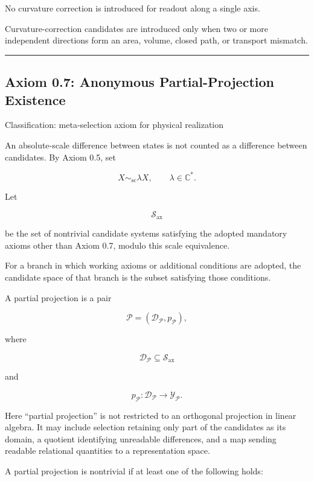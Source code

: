 \documentclass[
  a4paper,
]{article}
\begin{document}
No curvature correction is introduced for readout along a single axis.

Curvature-correction candidates are introduced only when two or more
independent directions form an area, volume, closed path, or transport
mismatch.

\begin{center}\rule{0.5\linewidth}{0.5pt}\end{center}

\subsection{Axiom 0.7: Anonymous Partial-Projection
Existence}\label{axiom-0.7-anonymous-partial-projection-existence}

Classification: meta-selection axiom for physical realization

An absolute-scale difference between states is not counted as a
difference between candidates. By Axiom 0.5, set

\[
X\sim_{\mathrm{sc}}\lambda X,
\qquad
\lambda\in\mathbb C^\ast.
\]

Let

\[
\mathscr S_{\mathrm{ax}}
\]

be the set of nontrivial candidate systems satisfying the adopted
mandatory axioms other than Axiom 0.7, modulo this scale equivalence.

For a branch in which working axioms or additional conditions are
adopted, the candidate space of that branch is the subset satisfying
those conditions.

A partial projection is a pair

\[
\mathcal P
=
\left(
\mathscr D_{\mathcal P},
p_{\mathcal P}
\right),
\]

where

\[
\mathscr D_{\mathcal P}
\subseteq
\mathscr S_{\mathrm{ax}}
\]

and

\[
p_{\mathcal P}:
\mathscr D_{\mathcal P}
\longrightarrow
\mathscr Y_{\mathcal P}.
\]

Here ``partial projection'' is not restricted to an orthogonal
projection in linear algebra. It may include selection retaining only
part of the candidates as its domain, a quotient identifying unreadable
differences, and a map sending readable relational quantities to a
representation space.

A partial projection is nontrivial if at least one of the following
holds:
\end{document}
